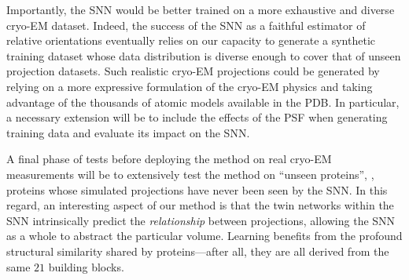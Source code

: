 Importantly, the SNN would be better trained on a more exhaustive and diverse cryo-EM dataset.
Indeed, the success of the SNN as a faithful estimator of relative orientations eventually relies on our capacity to generate a synthetic training dataset whose data distribution is diverse enough to cover that of unseen projection datasets.
Such realistic cryo-EM projections could be generated by relying on a more expressive formulation of the cryo-EM physics and taking advantage of the thousands of atomic models available in the PDB\@.
In particular, a necessary extension will be to include the effects of the PSF when generating training data and evaluate its impact on the SNN\@. %

A final phase of tests before deploying the method on real cryo-EM measurements will be to extensively test the method on ``unseen proteins'', \ie, proteins whose simulated projections have never been seen by the SNN\@.
In this regard, an interesting aspect of our method is that the twin networks within the SNN intrinsically predict the \textit{relationship} between projections, allowing the SNN as a whole to abstract the particular volume.
Learning benefits from the profound structural similarity shared by proteins---after all, they are all derived from the same $21$ building blocks.

